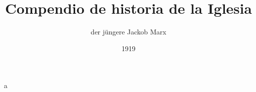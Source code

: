\documentclass[12pt]{article}
\title{Compendio de historia de la Iglesia}
\author{der jüngere Jackob Marx}
\date{1919}
\begin{document}
\begin{titlepage} %
  \centering
  a
\end{titlepage}

\tableofcontents %
\end{document}
